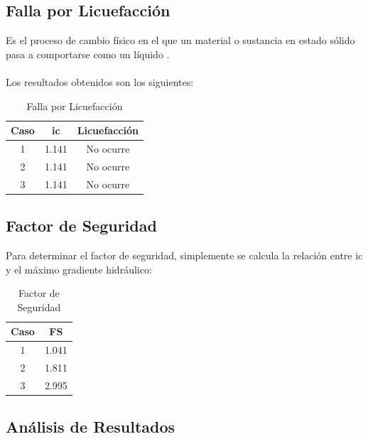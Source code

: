 \subsection{Falla por Licuefacción}

Es el proceso de cambio físico en el que un material o sustancia en estado sólido pasa a comportarse como un líquido \textbf{\cite{WebReference2024}}.
\\ \\
Los resultados obtenidos son los siguientes:

\begin{table}[H]
  \centering
  \begin{tabular}{|c|c|c|}
    \hline
    Caso & ic & Licuefacción\\
    \hline
    1 & 1.141 & No ocurre \\ \hline
    2 & 1.141 & No ocurre \\ \hline
    3 & 1.141 & No ocurre \\
    \hline
  \end{tabular}
  \caption{Falla por Licuefacción}
\end{table}

\subsection{Factor de Seguridad}

Para determinar el factor de seguridad, simplemente se calcula la relación entre ic y el máximo gradiente hidráulico:

\begin{table}[H]
  \centering
  \begin{tabular}{|c|c|}
    \hline
    Caso & FS \\
    \hline
    1 & 1.041 \\ \hline
    2 & 1.811 \\ \hline
    3 & 2.995 \\
    \hline
  \end{tabular}
  \caption{Factor de Seguridad}
\end{table}

\subsection{Análisis de Resultados}

